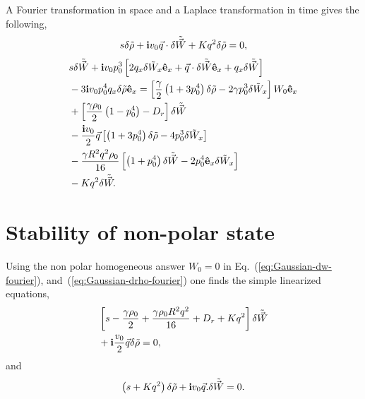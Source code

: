 \documentclass[reprint,floatfix,amsmath,amssymb,aps,pre,showkeys,showpacs,superscriptaddress]{revtex4-1}
\newcommand{\p}{p}
\newcommand{\e}{{\bf \hat{e}}}
\newcommand{\im}{{\rm \bf i}}
\newcommand{\w}{W}
\newcommand{\vw}{\vec{\w}}
\newcommand{\tw}{\tilde{\w}}
\newcommand{\tvw}{\tilde{\vec{\w}}}
\newcommand{\hl}[1]{\textcolor{hlcolor}{#1}}
\newcommand{\reqs}[2]{Eq.~(\ref{#1}), and~(\ref{#2})}
\begin{document}
A Fourier transformation in space and a Laplace transformation in time gives the following, \hl{
\begin{equation}
s \delta \tilde{\rho} + \im v_0 \vec{q}  \cdot \delta \tvw + K q^2 \delta \tilde{\rho} = 0,
\label{eq:Gaussian-drho-fourier}
\end{equation}
\begin{equation}
\begin{aligned}
&s \delta \tvw + \im v_0 \p_0^3 \left[ 2 q_x \delta \tw_x \e_x +  \vec{q} \cdot \delta \tvw \e_x + q_x \delta \tvw \right] \\
&- 3 \im v_0 \p_0^4 q_x \delta \tilde{\rho} \e_x = \left[ \frac{\gamma}{2} \left( 1 + 3 \p_0^4 \right) \delta \tilde{\rho} - 2 \gamma \p_0^3 \delta \tw_x \right] \w_0 \e_x \\
&+\left[ \frac{\gamma \rho_0}{2} \left( 1 - \p_0^4 \right) - D_r  \right] \delta \tvw \\
&- \frac{\im v_0}{2} \vec{q} \left[ \left( 1 + 3 \p_0^4 \right) \delta \tilde{\rho} - 4 \p_0^3 \delta \tw_x \right] \\
&- \frac{\gamma R^2 q^2 \rho_0}{16} \left[ \left( 1+\p_0^4 \right) \delta \tvw - 2 \p_0^4 \e_x \delta \tw_x \right] \\
&- K q^2 \delta \tvw.
\end{aligned}
\label{eq:Gaussian-dw-fourier}
\end{equation}
}



\section{Stability of non-polar state}
\label{ap:non-polar-stability}

Using the non polar homogeneous answer $\w_0 = 0$ in \reqs{eq:Gaussian-dw-fourier}{eq:Gaussian-drho-fourier} one finds the simple linearized equations,
\begin{equation}
\begin{aligned}
&\left[ s - \frac{\gamma \rho_0}{2} + \frac{\gamma \rho_0 R^2  q^2}{16} + D_r + K q^2 \right]  \delta \tilde{\vw} \\
&+ \im \frac{v_0}{2} \vec{q} \delta \tilde{\rho} = 0,
\end{aligned}
\end{equation}
and
\begin{equation}
\left( s + K q^2 \right) \delta \tilde{\rho} + \im v_0 \vec{q} . \delta \tilde{\vw} = 0.
\end{equation}
\end{document}
